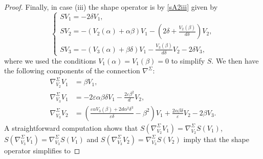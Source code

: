 \documentclass{amsart}
\theoremstyle{plain}
\theoremstyle{remark}
\begin{document}
{\begin{proof}
Finally, in case (iii) the shape operator is by \eqref{sA2iii} given by
\[
\left\{
\begin{array}{l}
SV_1 =  -2\delta V_1, \\[2 pt]
SV_2 =  -(V_2(\alpha)+\alpha\beta) V_1  - \left(2\delta+\frac{V_2(\beta)}{d\delta} \right)V_2, \\[2 pt]
SV_3 =  -\left(V_3(\alpha) +\beta \delta \right) V_1 - \frac{V_3(\beta)}{d\delta} V_2 - 2\delta V_3,
\end{array}
\right.
\]
where we used the conditions $V_1(\alpha) = V_1(\beta)=0$ to simplify $S$. We then have the following components of the connection $\nabla^\Sigma$:
\begin{align*}
\nabla^\Sigma_{V_2} V_1 &= \beta V_1,\\
\nabla^\Sigma_{V_3} V_1 &= -2\varepsilon\alpha\beta\delta V_1-\frac{2\varepsilon \beta^2}{d}V_2,\\
\nabla^\Sigma_{V_3} V_2 &= \left(\frac{\varepsilon\alpha V_3(\beta) + 2d\alpha^2\delta^3}{\varepsilon\delta} - \beta^2\right)V_1  + \frac{2\alpha\beta\delta}{\varepsilon}V_2 - 2\beta V_3.
\end{align*}
%
A straightforward computation shows that $S(\nabla^\Sigma_{V_2} V_1) = \nabla^\Sigma_{V_2} S(V_1)$, $S(\nabla^\Sigma_{V_3} V_1 ) = \nabla^\Sigma_{V_3} S(V_1)$ and $S(\nabla^\Sigma_{V_3} V_2) = \nabla^\Sigma_{V_3} S(V_2)$ imply that the shape operator simplifies to

\end{proof}}
\end{document}
